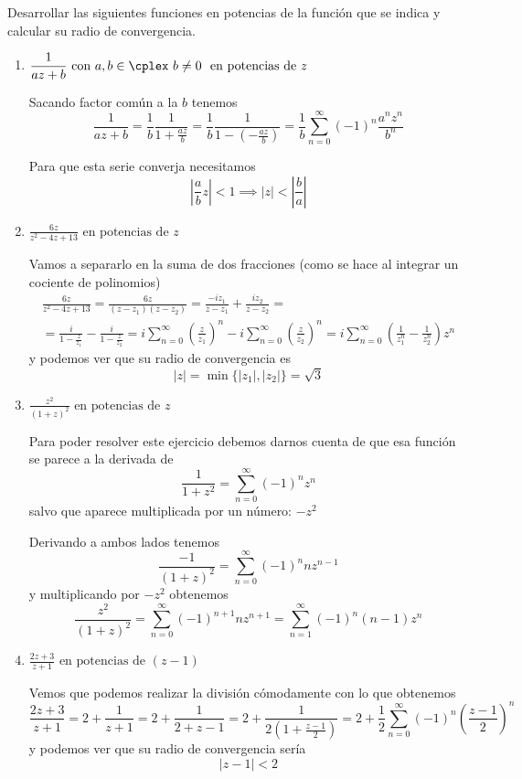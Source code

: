 \documentclass{apuntes}
\begin{document}
\begin{example}
Desarrollar las siguientes funciones en potencias de la función que se indica y calcular su radio de convergencia.
\begin{enumerate}
\item $\displaystyle \frac{1}{az+b} \text{ con } a,b \in \cplex \ b \neq 0 \ \text{ en potencias de } z$

Sacando factor común a la $b$ tenemos
\[\frac{1}{az+b} =  \frac{1}{b} \frac{1}{1+\frac{az}{b}} = \frac{1}{b}\frac{1}{1-\left(-\frac{az}{b}\right)} = \frac{1}{b}\sum_{n=0}^{\infty}(-1)^n\frac{a^nz^n}{b^n}\]

Para que esta serie converja necesitamos
\[\left| \frac{a}{b}z\right| < 1 \implies |z| < \left| \frac{b}{a} \right|\]

\item $\displaystyle \frac{6z}{z^2-4z+13} \text{ en potencias de } z$

Vamos a separarlo en la suma de dos fracciones (como se hace al integrar un cociente de polinomios)
\begin{gather*}\frac{6z}{z^2-4z+13} = \frac{6z}{(z-z_1)(z-z_2)} = \frac{-iz_1}{z-z_1} + \frac{iz_2}{z-z_2} = \\
= \frac{i}{1-\frac{z}{z_1}} - \frac{i}{1-\frac{z}{z_2}} = i\sum_{n=0}^{\infty}\left(\frac{z}{z_1}\right)^n - i\sum_{n=0}^{\infty}\left(\frac{z}{z_2}\right)^n = i\sum_{n=0}^{\infty}\left( \frac{1}{z_1^n}-\frac{1}{z_2^n}\right)z^n\end{gather*}
y podemos ver que su radio de convergencia es
\[|z| = \min \{|z_1|, |z_2|\}= \sqrt{3}\]

\item $\displaystyle \frac{z^2}{(1+z)^2} \text{ en potencias de } z$

Para poder resolver este ejercicio debemos darnos cuenta de que esa función se parece a la derivada de
\[\frac{1}{1+z^2} = \sum_{n=0}^{\infty}(-1)^n z^n\]
salvo que aparece multiplicada por un número: $-z^2$

Derivando a ambos lados tenemos
\[\frac{-1}{(1+z)^2}=\sum_{n=0}^{\infty}(-1)^nnz^{n-1}\]
y multiplicando por $-z^2$ obtenemos
\[\frac{z^2}{(1+z)^2} = \sum_{n=0}^{\infty}(-1)^{n+1}nz^{n+1} = \sum_{n=1}^{\infty}(-1)^n(n-1)z^{n}\]

\item $\displaystyle \frac{2z+3}{z+1} \text{ en potencias de } (z-1)$

Vemos que podemos realizar la división cómodamente con lo que obtenemos
\[\frac{2z+3}{z+1}=2+\frac{1}{z+1} = 2 + \frac{1}{2+z-1} = 2 + \frac{1}{2\left( 1+\frac{z-1}{2}\right)} = 2+\frac{1}{2}\sum_{n=0}^{\infty}(-1)^n\left(\frac{z-1}{2} \right)^n\]
y podemos ver que su radio de convergencia sería
\[|z-1| < 2\]

\end{enumerate}
\end{example}
\end{document}
